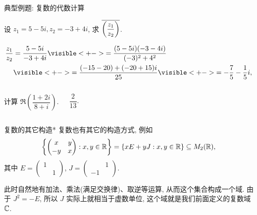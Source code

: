 \begin{frame}[<*>]{典型例题: 复数的代数计算}
\onslide<+->
\begin{example}
设 $z_1=5-5i,z_2=-3+4i$, 求 $\overline{\left(\dfrac{z_1}{z_2}\right)}$.
\end{example}
\onslide<+->
\begin{solution}
\vspace{-\baselineskip}
\begin{align*}
\frac{z_1}{z_2}&=\frac{5-5i}{-3+4i}
\visible<+->{=\frac{(5-5i)(-3-4i)}{(-3)^2+4^2}}\\
&\visible<+->{=\frac{(-15-20)+(-20+15)i}{25}}
\visible<+->{=-\frac75-\frac15i,}
\end{align*}
\vspace{-5pt}
\end{solution}

\vspace{-5pt}
\onslide<+->
\begin{columns}
		\begin{exercise}
		计算 $\Re\left(\dfrac{1+2i}{8+i}\right)$.
		\end{exercise}\onslide<+->
		\begin{answer}
		$\dfrac2{13}$.
		\end{answer}
\end{columns}
\end{frame}


\begin{frame}{复数的其它构造*}
\onslide<+->复数也有其它的构造方式, 
\onslide<+->例如
	\[{\left\{\begin{pmatrix}
	x&y\\-y&x\end{pmatrix}: x,y\in{\mathbb{R}}\right\}}
	={\left\{xE+yJ: x,y\in{\mathbb{R}}\right\}}\subseteq M_2({\mathbb{R}}),\]
\onslide<+->其中 $E=\begin{pmatrix}1& \\&1\end{pmatrix}$,
	$J=\begin{pmatrix}&1\\-1&\end{pmatrix}$.

\onslide<+->此时自然地有加法、乘法(满足交换律)、取逆等运算, 从而这个集合构成一个域.
\onslide<+->由于 $J^2=-E$, 所以 $J$ 实际上就相当于虚数单位, 这个域就是我们前面定义的复数域 ${\mathbb{C}}$.
\end{frame}

